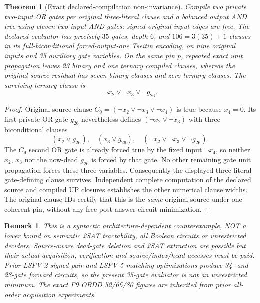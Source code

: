 \documentclass[11pt]{article}
\newtheorem{theorem}{Theorem}
\newtheorem{remark}{Remark}
\begin{document}
\begin{theorem}[Exact declared-compilation non-invariance]
Compile two private two-input OR gates per original three-literal clause and a balanced output AND tree using eleven two-input AND gates; signed original-input edges are free. The declared evaluator has precisely $35$ gates, depth $6$, and $106=3(35)+1$ clauses in its full-biconditional forced-output-one Tseitin encoding, on nine original inputs and 35 auxiliary gate variables. On the same pin $p$, repeated exact unit propagation leaves 23 binary and \emph{one ternary} compiled clauses, whereas the original source residual has seven binary clauses and \emph{zero} ternary clauses. The surviving ternary clause is
\[
\neg x_2\vee\neg x_3\vee\neg g_{26}.
\]
\end{theorem}
\begin{proof}
Original source clause $C_9=(\neg x_2\vee\neg x_3\vee\neg x_4)$ is true because $x_4=0$. Its first private OR gate $g_{26}$ nevertheless defines $(\neg x_2\vee\neg x_3)$ with three biconditional clauses
\[
(x_2\vee g_{26}),\quad(x_3\vee g_{26}),\quad
(\neg x_2\vee\neg x_3\vee\neg g_{26}).
\]
The $C_9$ second OR gate is already forced true by the fixed input $\neg x_4$, so neither $x_2$, $x_3$ nor the now-dead $g_{26}$ is forced by that gate. No other remaining gate unit propagation forces these three variables. Consequently the displayed three-literal gate-defining clause survives. Independent complete computation of the declared source and compiled UP closures establishes the other numerical clause widths. The original clause IDs certify that this is the \emph{same} original source under one coherent pin, without any free post-answer circuit minimization. \end{proof}
\begin{remark}
This is a syntactic architecture-dependent counterexample, NOT a lower bound on semantic 2SAT tractability, all Boolean circuits or unrestricted deciders. Source-aware dead-gate deletion and 2SAT extraction are possible but their actual acquisition, verification and source/index/head accesses must be paid. Prior LSPV-2 signed-pair and LSPV-5 matching optimizations produce 34- and 28-gate forward circuits, so the present 35-gate evaluator is not an unrestricted minimum. The exact F9 OBDD 52/66/80 figures are inherited from prior all-order acquisition experiments.
\end{remark}
\end{document}
